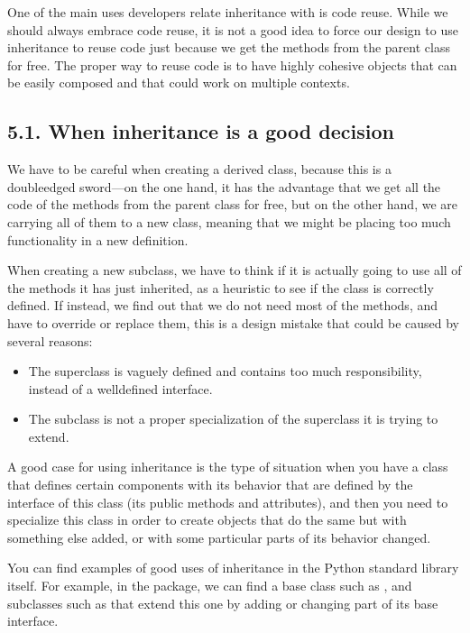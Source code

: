 \documentclass[a4paper,10pt,english]{sphinxmanual}
\begin{document}
One of the main uses developers relate inheritance with is code reuse. While we should always embrace code
reuse, it is not a good idea to force our design to use inheritance to reuse code just because we get the
methods from the parent class for free. The proper way to reuse code is to have highly cohesive objects that
can be easily composed and that could work on multiple contexts.


\subsection{5.1. When inheritance is a good decision}
\label{\detokenize{chapters/3_general_traits/index:when-inheritance-is-a-good-decision}}
We have to be careful when creating a derived class, because this is a double\sphinxhyphen{}edged sword—on the one hand, it
has the advantage that we get all the code of the methods from the parent class for free, but on the other
hand, we are carrying all of them to a new class, meaning that we might be placing too much functionality in a
new definition.

When creating a new subclass, we have to think if it is actually going to use all of the methods it has just
inherited, as a heuristic to see if the class is correctly defined. If instead, we find out that we do not
need most of the methods, and have to override or replace them, this is a design mistake that could be caused
by several reasons:
\begin{itemize}
\item {} 
The superclass is vaguely defined and contains too much responsibility, instead of a well\sphinxhyphen{}defined interface.

\item {} 
The subclass is not a proper specialization of the superclass it is trying to extend.

\end{itemize}

A good case for using inheritance is the type of situation when you have a class that defines certain
components with its behavior that are defined by the interface of this class (its public methods and
attributes), and then you need to specialize this class in order to create objects that do the same but with
something else added, or with some particular parts of its behavior changed.

You can find examples of good uses of inheritance in the Python standard library itself. For example, in the
 package, we can find a base class such as , and subclasses such as
 that extend this one by adding or changing part of its base interface.
\end{document}
